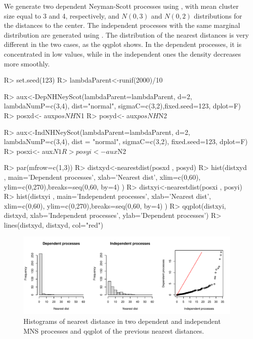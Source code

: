 We generate two dependent Neyman-Scott processes using ,  with  mean cluster size equal to 3   and 4, respectively, and  $N(0,3)$ and $N(0,2)$ distributions  for the distances to the center.   The independent processes  with the same marginal distribution are generated using .  The distribution of the nearest distances is  very different in the two cases, as the qqplot shows.  In the dependent  processes, it is concentrated in  low values, while  in the independent ones the density decreases more smoothly. 
\begin{example}
R> set.seed(123)
R> lambdaParent<-runif(2000)/10

R> aux<-DepNHNeyScot(lambdaParent=lambdaParent, d=2, lambdaNumP=c(3,4), 
        dist="normal", sigmaC=c(3,2),fixed.seed=123, dplot=F)
R> posxd<- aux$posNH$N1
R> posyd<- aux$posNH$N2

R> aux<-IndNHNeyScot(lambdaParent=lambdaParent, d=2, lambdaNumP=c(3,4),
         dist = "normal", sigmaC=c(3,2), fixed.seed=123, dplot=F)
R> posxi<- aux$N1
R> posyi<- aux$N2

R> par(mfrow=c(1,3))
R> distxyd<-nearestdist(posxd , posyd)
R> hist(distxyd , main='Dependent processes', xlab='Nearest dist',
        xlim=c(0,60), ylim=c(0,270),breaks=seq(0,60, by=4) )
R> distxyi<-nearestdist(posxi , posyi)
R> hist(distxyi , main='Independent processes', xlab='Nearest dist',
        xlim=c(0,60), ylim=c(0,270),breaks=seq(0,60, by=4) )
R> qqplot(distxyi, distxyd, xlab='Independent processes', 
          ylab='Dependent processes')
R> lines(distxyd, distxyd, col="red")
\end{example}
\begin{figure}[h]
		\includegraphics[width=14cm]{figure/Sev14-1} 
		\caption{Histograms of nearest distance in two  dependent and independent MNS processes and qqplot  of the previous nearest distances.}
\end{figure}
															

																	
				
